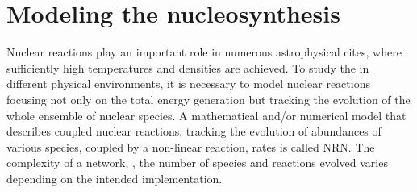 
\section{Modeling the nucleosynthesis}

Nuclear reactions play an important role in numerous astrophysical cites, where sufficiently high temperatures 
and densities are achieved. 
%
To study the \nuc{} in different physical environments, it is necessary to model nuclear reactions focusing 
not only on the total energy generation \citep[\eg][]{Weaver:1978,Mueller:1986,Timmes:1999} but tracking the 
evolution of the whole ensemble of nuclear species. A mathematical and/or numerical model that describes 
coupled nuclear reactions, tracking the evolution of abundances of various species, coupled by a non-linear 
reaction, rates is called \ac{NRN}.
%
The complexity of a network, \ie, the number of species and reactions evolved 
varies depending on the intended implementation. 
%
%
